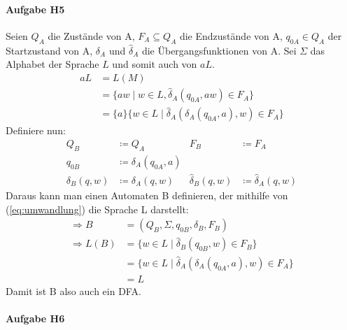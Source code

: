 \documentclass[11pt]{article}
\begin{document}
\paragraph{Aufgabe H5}
Seien $Q_{A}$ die Zustände von A, $F_{A}\subseteq Q_{A}$ die Endzustände von A, $q_{0A}\in Q_{A}$ der Startzustand von A, $\delta_{A}$ und $\hat{\delta}_{A}$ die Übergangsfunktionen von A. Sei $\Sigma$ das Alphabet der Sprache $L$ und somit auch von $aL$.
\begin{equation}\label{eq:umwandlung}
\begin{split}
aL &= L(M)\\
&= \{aw\mid w\in L, \hat{\delta}_{A}(q_{0A}, aw)\in F_{A}\}\\
&= \{a\}\{w\in L\mid \hat{\delta}_{A}(\delta_{A}(q_{0A}, a), w)\in F_{A}\}
\end{split}
\end{equation}
Definiere nun: 
\begin{align*}
Q_{B}&\coloneqq Q_{A} & F_{B}&\coloneqq F_{A}\\
q_{0B}&\coloneqq\delta_{A}(q_{0A},a)\\
\delta_{B}(q,w)&\coloneqq\delta_{A}(q,w) & \hat{\delta}_{B}(q,w)&\coloneqq\hat{\delta}_{A}(q,w)
\end{align*}
Daraus kann man einen Automaten B definieren, der mithilfe von (\ref{eq:umwandlung}) die Sprache L darstellt:
\begin{align*}
\Rightarrow B&=(Q_{B},\Sigma, q_{0B}, \delta_{B}, F_{B})\\
\Rightarrow L(B)&=\{w\in L\mid \hat{\delta}_{B}(q_{0B},w)\in F_{B}\}\\
				&=\{w\in L\mid \hat{\delta}_{A}(\delta_{A}(q_{0A}, a), w)\in F_{A}\}\\
				&=L
\end{align*}
Damit ist B also auch ein DFA.

\paragraph{Aufgabe H6}
\begin{center}
\end{center}
\end{document}
